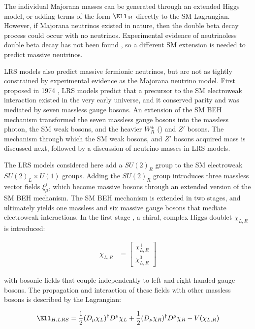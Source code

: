 The individual Majorana masses can be generated through an extended Higgs model, or adding terms of the 
form $\Ell_{M}$ directly to the SM Lagrangian.  However, if Majorana neutrinos existed in nature, then 
the double beta decay process could occur with no neutrinos.  Experimental evidence of neutrinoless double 
beta decay has not been found \cite{igexDblBetaDecay,gerdaDblBetaDecay}, so a different SM extension is 
needed to predict massive neutrinos.

LRS models also predict massive fermionic neutrinos, but are not as tightly constrained by experimental 
evidence as the Majorana neutrino model.
First proposed in 1974 \cite{earlyLRSModel}, LRS models predict that a precursor to the SM electroweak 
interaction existed in the very early universe, and it conserved parity and was mediated by seven massless 
gauge bosons.  An extension of the SM BEH mechanism transformed the seven massless gauge bosons 
into the massless photon, the SM weak bosons, and the heavier $W^{\pm}_{R}$ (\WR) and $Z'$ bosons.  
The mechanism through which the SM weak bosons, \WR and $Z'$ bosons acquired mass is discussed next, 
followed by a discussion of neutrino masses in LRS models.

The LRS models considered here add a $SU(2)_{R}$ group to the SM electroweak $SU(2)_{L} \times U(1)$ groups.
Adding the $SU(2)_{R}$ group introduces three massless vector fields $\xi^{j}_{\mu}$, which become massive 
bosons through an extended version of the SM BEH mechanism.  The SM BEH mechanism is extended in two stages, 
and ultimately yields one massless and six massive gauge bosons that mediate electroweak interactions.  In 
the first stage \cite{lrsHiggsStageOne}, a chiral, complex Higgs doublet $\chi_{L,R}$ is introduced: 

\begin{align}
	\chi_{L,R} &= \begin{bmatrix}
	\chi^{+}_{L,R} \\
	\chi^{0}_{L,R}
	\end{bmatrix}
	\label{eq:stageOneVEV}
\end{align}

with bosonic fields that couple independently to left and right-handed gauge bosons.  The propagation and 
interaction of these fields with other massless bosons is described by the Lagrangian:

\begin{equation}
	\Ell_{H,LRS} = \frac{1}{2}(D_{\mu}\chi_{L})^{\dagger}D^{\mu}\chi_{L} + \frac{1}{2}(D_{\mu}\chi_{R})^{\dagger}D^{\mu}\chi_{R} - V(\chi_{L,R})
\end{equation}

